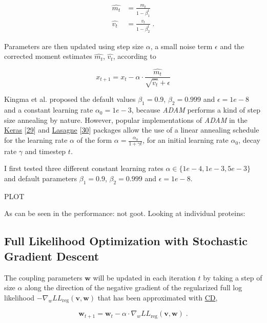 \documentclass[12pt,a4paper,twoside]{book}
\newcommand{\LLreg}{L\!L_\mathrm{reg}}
\renewcommand{\v}{\mathbf{v}}
\newcommand{\w}{\mathbf{w}}
\theoremstyle{definition}
\theoremstyle{definition}
\theoremstyle{remark}
\begin{document}
\begin{align}
  \hat{m_t} &= \frac{m_t}{1-\beta_1^t} \\
  \hat{v_t} &= \frac{v_t}{1-\beta_2^t} \; .
\end{align}

Parameters are then updated using step size \(\alpha\), a small noise
term \(\epsilon\) and the corrected moment estimates \(\hat{m_t}\),
\(\hat{v_t}\), according to

\begin{equation}
  x_{t+1} = x_t - \alpha \cdot \frac{\hat{m_t}}{\sqrt{\hat{v_t}} + \epsilon}
\end{equation}

Kingma et al. proposed the default values \(\beta_1=0.9\),
\(\beta_2=0.999\) and \(\epsilon=1e−8\) and a constant learning rate
\(\alpha_0=1e-3\), because \emph{ADAM} performs a kind of step size
annealing by nature. However, popular implementations of \emph{ADAM} in
the
\href{https://github.com/fchollet/keras/blob/master/keras/optimizers.py\#L385}{Keras}
{[}\protect\hyperlink{ref-Chollet2015}{29}{]} and
\href{https://github.com/Lasagne/Lasagne/blob/master/lasagne/updates.py\#L565-L629}{Lasagne}
{[}\protect\hyperlink{ref-Dieleman2015}{30}{]} packages allow the use of
a linear annealing schedule for the learning rate \(\alpha\) of the form
\(\alpha = \frac{\alpha_0}{1 + \gamma t}\), for an initial learning rate
\(\alpha_0\), decay rate \(\gamma\) and timestep \(t\).

I first tested three different constant learning rates
\(\alpha \in \{1e-4, 1e-3, 5e-3\}\) and default parameters
\(\beta_1=0.9\), \(\beta_2=0.999\) and \(\epsilon=1e−8\).

PLOT

As can be seen in the performance: not goot. Looking at individual
proteins:

\subsection{Full Likelihood Optimization with Stochastic Gradient
Descent}\label{full-likelihood-optimization-with-stochastic-gradient-descent}

The coupling parameters \(\w\) will be updated in each iteration \(t\)
by taking a step of size \(\alpha\) along the direction of the negative
gradient of the regularized full log likelihood
\(- \nabla_w \LLreg(\v,\w)\) that has been approximated with
\protect\hyperlink{abbrev}{CD},

\begin{equation}
  \w_{t+1} = \w_t - \alpha \cdot \nabla_w \LLreg(\v,\w) \; .
\end{equation}
\end{document}
